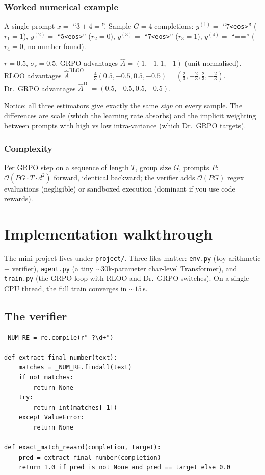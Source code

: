 \documentclass[11pt,oneside]{scrbook}
\begin{document}
\subsection*{Worked numerical example}

A single prompt $x = $ ``$3+4=$''. Sample $G = 4$ completions:
$y^{(1)} = $ ``$7$\verb|<eos>|'' ($r_1 = 1$),
$y^{(2)} = $ ``$5$\verb|<eos>|'' ($r_2 = 0$),
$y^{(3)} = $ ``$7$\verb|<eos>|'' ($r_3 = 1$),
$y^{(4)} = $ ``=='' ($r_4 = 0$, no number found).

$\bar r = 0.5$, $\sigma_r = 0.5$. GRPO advantages
$\hat A = (1, -1, 1, -1)$ (unit normalised). RLOO advantages
$\hat A^{\text{RLOO}} = \frac{4}{3}(0.5, -0.5, 0.5, -0.5) = (\tfrac{2}{3}, -\tfrac{2}{3}, \tfrac{2}{3}, -\tfrac{2}{3})$.
Dr.~GRPO advantages
$\hat A^{\text{Dr}} = (0.5, -0.5, 0.5, -0.5)$.

Notice: all three estimators give exactly the same \emph{sign} on every
sample. The differences are scale (which the learning rate absorbs) and
the implicit weighting between prompts with high vs low intra-variance
(which Dr.~GRPO targets).

\subsection*{Complexity}

Per GRPO step on a sequence of length $T$, group size $G$, prompts $P$:
$\mathcal{O}(PG \cdot T \cdot d^2)$ forward, identical backward; the
verifier adds $\mathcal{O}(PG)$ regex evaluations (negligible) or
sandboxed execution (dominant if you use code rewards).

\chapter{Implementation walkthrough}

The mini-project lives under \texttt{project/}. Three files matter:
\texttt{env.py} (toy arithmetic + verifier), \texttt{agent.py} (a tiny
$\sim 30$k-parameter char-level Transformer), and \texttt{train.py} (the
GRPO loop with RLOO and Dr.~GRPO switches). On a single CPU thread, the
full train converges in $\sim 15$\,s.

\section{The verifier}

\begin{verbatim}
_NUM_RE = re.compile(r"-?\d+")

def extract_final_number(text):
    matches = _NUM_RE.findall(text)
    if not matches:
        return None
    try:
        return int(matches[-1])
    except ValueError:
        return None

def exact_match_reward(completion, target):
    pred = extract_final_number(completion)
    return 1.0 if pred is not None and pred == target else 0.0
\end{verbatim}
\end{document}
